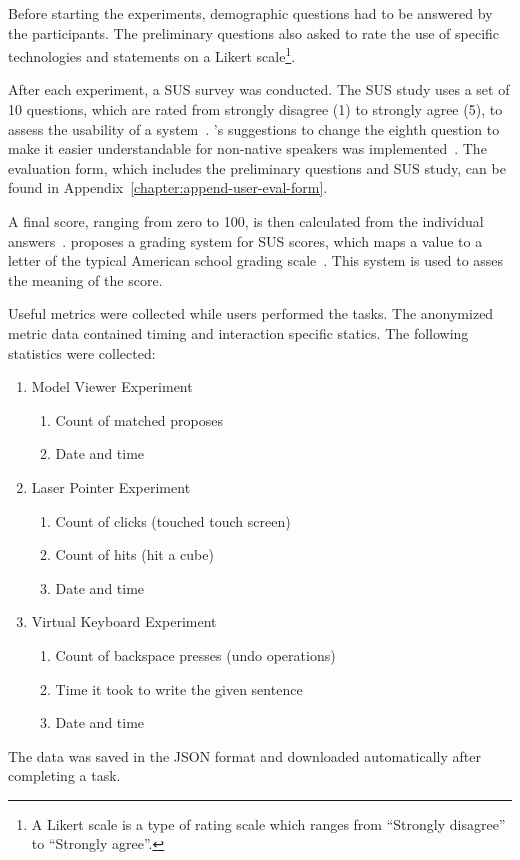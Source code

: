Before starting the experiments, demographic questions had to be answered by the participants. The preliminary questions also asked to rate the use of specific technologies and statements on a Likert scale\footnote{A Likert scale is a type of rating scale which ranges from \enquote{Strongly disagree} to \enquote{Strongly agree}.}. 

After each experiment, a \gls{SUS} survey was conducted. The \gls{SUS} study uses a set of 10 questions, which are rated from strongly disagree (1) to strongly agree (5), to assess the usability of a system~\cite[3]{Brooke.1996}. \citeauthor{Finstad.2006}'s suggestions to change the eighth question to make it easier understandable for non-native speakers was implemented~\cite[188]{Finstad.2006}. The evaluation form, which includes the preliminary questions and \gls{SUS} study, can be found in Appendix~\ref{chapter:append-user-eval-form}.

A final score, ranging from zero to 100, is then calculated from the individual answers~\cite{Brooke.1996}. \citeauthor{Bangor.2009} proposes a grading system for \gls{SUS} scores, which maps a value to a letter of the typical American school grading scale~\cite{Bangor.2009}. This system is used to asses the meaning of the score.

Useful metrics were collected while users performed the tasks. The anonymized metric data contained timing and interaction specific statics. The following statistics were collected:
\begin{enumerate}
  \item Model Viewer Experiment
  \begin{enumerate}
    \item Count of matched proposes
    \item Date and time
  \end{enumerate}

  \item Laser Pointer Experiment
  \begin{enumerate}
    \item Count of clicks (touched touch screen)
    \item Count of hits (hit a cube)
    \item Date and time
  \end{enumerate}
  
  \item Virtual Keyboard Experiment
  \begin{enumerate}
    \item Count of backspace presses (undo operations)
    \item Time it took to write the given sentence
    \item Date and time
  \end{enumerate}
\end{enumerate}
The data was saved in the JSON format and downloaded automatically after completing a task.